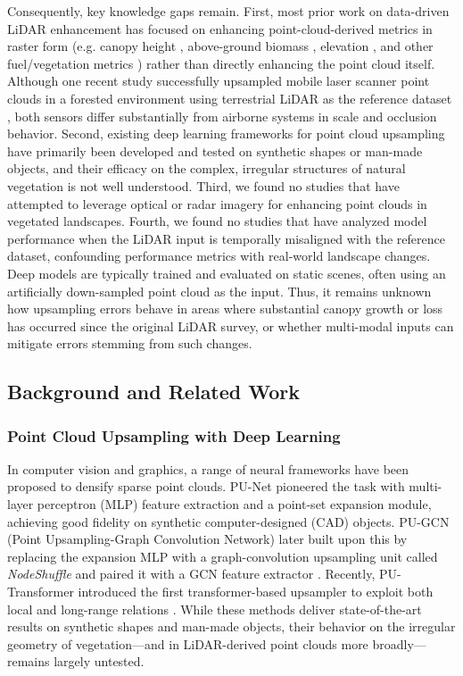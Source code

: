 \documentclass[remotesensing,article,submit,pdftex,moreauthors]{Definitions/mdpi}
\begin{document}
Consequently, key knowledge gaps remain. First, most prior work on data-driven LiDAR enhancement has focused on enhancing point-cloud-derived metrics in raster form (e.g. canopy height \cite{wilkes_mapping_2015, wagner_sub-meter_2024}, above-ground biomass \cite{shendryk2022fusing}, elevation \cite{li2023large}, and other fuel/vegetation metrics \cite{taneja2023up, gazzea2023high}) rather than directly enhancing the point cloud itself. Although one recent study successfully upsampled mobile laser scanner point clouds in a forested environment using terrestrial LiDAR as the reference dataset \cite{remijnse2024upsampling}, both sensors differ substantially from airborne systems in scale and occlusion behavior. Second, existing deep learning frameworks for point cloud upsampling have primarily been developed and tested on synthetic shapes or man-made objects, and their efficacy on the complex, irregular structures of natural vegetation is not well understood. Third, we found no studies that have attempted to leverage optical or radar imagery for enhancing point clouds in vegetated landscapes. Fourth, we found no studies that have analyzed model performance when the LiDAR input is temporally misaligned with the reference dataset, confounding performance metrics with real-world landscape changes. Deep models are typically trained and evaluated on static scenes, often using an artificially down-sampled point cloud as the input. Thus, it remains unknown how upsampling errors behave in areas where substantial canopy growth or loss has occurred since the original LiDAR survey, or whether multi-modal inputs can mitigate errors stemming from such changes.

\subsection{Background and Related Work}

\subsubsection{Point Cloud Upsampling with Deep Learning}

In computer vision and graphics, a range of neural frameworks have been proposed to densify sparse point clouds. PU-Net \cite{yu2018pu} pioneered the task with multi-layer perceptron (MLP) feature extraction and a point-set expansion module, achieving good fidelity on synthetic computer-designed (CAD) objects. PU-GCN (Point Upsampling-Graph Convolution Network) later built upon this by replacing the expansion MLP with a graph-convolution upsampling unit called \emph{NodeShuffle} and paired it with a GCN feature extractor \cite{qian2021pu}. Recently, PU-Transformer introduced the first transformer-based upsampler to exploit both local and long-range relations \cite{qiu2022pu}. While these methods deliver state-of-the-art results on synthetic shapes and man-made objects, their behavior on the irregular geometry of vegetation—and in LiDAR-derived point clouds more broadly—remains largely untested.
\end{document}
